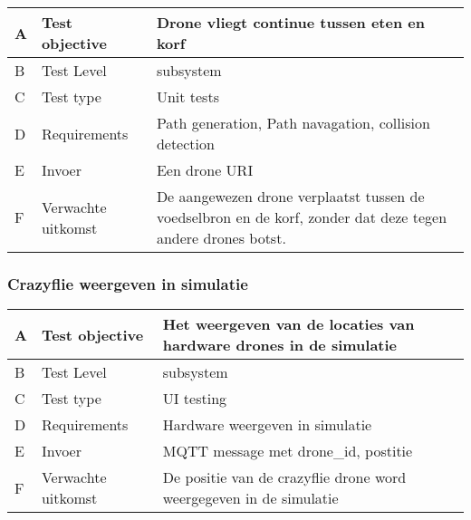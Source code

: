 \begin{table}[hbt!]
    \begin{tabular}[t]{|m{0.3cm}|m{3.2cm}|m{7.5cm}|}\hline
    A & Test objective & Drone vliegt continue tussen eten en korf\\ \hline
    B & Test Level & subsystem\\ \hline
    C & Test type & Unit tests\\ \hline
    D & Requirements & Path generation, Path navagation, collision detection\\ \hline
    E & Invoer & Een drone URI\\ \hline
    F & Verwachte uitkomst & De aangewezen drone verplaatst tussen de voedselbron en de korf,
     zonder dat deze tegen andere drones botst.\\ \hline
    \end{tabular}
\end{table}

\subsubsection{Crazyflie weergeven in simulatie}

\begin{table}[hbt!]
    \begin{tabular}[t]{|m{0.3cm}|m{3.2cm}|m{7.5cm}|}\hline
    A & Test objective & Het weergeven van de locaties van hardware drones in de simulatie\\ \hline
    B & Test Level & subsystem\\ \hline
    C & Test type & UI testing\\ \hline
    D & Requirements & Hardware weergeven in simulatie\\ \hline
    E & Invoer & MQTT message met drone\_id, postitie\\ \hline
    F & Verwachte uitkomst & De positie van de crazyflie drone word weergegeven in de simulatie\\ \hline
    \end{tabular}
\end{table}
